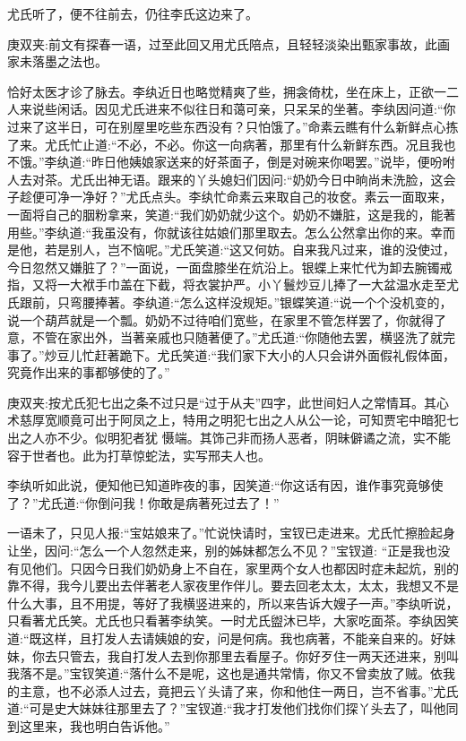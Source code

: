 \begin{parag}
    尤氏听了，便不往前去，仍往李氏这边来了。\begin{note}庚双夹:前文有探春一语，过至此回又用尤氏陪点，且轻轻淡染出甄家事故，此画家未落墨之法也。\end{note}恰好太医才诊了脉去。李纨近日也略觉精爽了些，拥衾倚枕，坐在床上，正欲一二人来说些闲话。因见尤氏进来不似往日和蔼可亲，只呆呆的坐著。李纨因问道:“你过来了这半日，可在别屋里吃些东西没有？只怕饿了。”命素云瞧有什么新鲜点心拣了来。尤氏忙止道:“不必，不必。你这一向病著，那里有什么新鲜东西。况且我也不饿。”李纨道:“昨日他姨娘家送来的好茶面子，倒是对碗来你喝罢。”说毕，便吩咐人去对茶。尤氏出神无语。跟来的丫头媳妇们因问:“奶奶今日中晌尚未洗脸，这会子趁便可净一净好？”尤氏点头。李纨忙命素云来取自己的妆奁。素云一面取来，一面将自己的胭粉拿来，笑道:“我们奶奶就少这个。奶奶不嫌脏，这是我的，能著用些。”李纨道:“我虽没有，你就该往姑娘们那里取去。怎么公然拿出你的来。幸而是他，若是别人，岂不恼呢。”尤氏笑道:“这又何妨。自来我凡过来，谁的没使过，今日忽然又嫌脏了？”一面说，一面盘膝坐在炕沿上。银蝶上来忙代为卸去腕镯戒指，又将一大袱手巾盖在下截，将衣裳护严。小丫鬟炒豆儿捧了一大盆温水走至尤氏跟前，只弯腰捧著。李纨道:“怎么这样没规矩。”银蝶笑道:“说一个个没机变的，说一个葫芦就是一个瓢。奶奶不过待咱们宽些，在家里不管怎样罢了，你就得了意，不管在家出外，当著亲戚也只随著便了。”尤氏道:“你随他去罢，横竖洗了就完事了。”炒豆儿忙赶著跪下。尤氏笑道:“我们家下大小的人只会讲外面假礼假体面，究竟作出来的事都够使的了。”\begin{note}庚双夹:按尤氏犯七出之条不过只是“过于从夫”四字，此世间妇人之常情耳。其心术慈厚宽顺竟可出于阿凤之上，特用之明犯七出之人从公一论，可知贾宅中暗犯七出之人亦不少。似明犯者犹 慑端。其饰己非而扬人恶者，阴昧僻谲之流，实不能容于世者也。此为打草惊蛇法，实写邢夫人也。\end{note}李纨听如此说，便知他已知道昨夜的事，因笑道:“你这话有因，谁作事究竟够使了？”尤氏道:“你倒问我！你敢是病著死过去了！”
\end{parag}


\begin{parag}
    一语未了，只见人报:“宝姑娘来了。”忙说快请时，宝钗已走进来。尤氏忙擦脸起身让坐，因问:“怎么一个人忽然走来，别的姊妹都怎么不见？”宝钗道: “正是我也没有见他们。只因今日我们奶奶身上不自在，家里两个女人也都因时症未起炕，别的靠不得，我今儿要出去伴著老人家夜里作伴儿。要去回老太太，太太，我想又不是什么大事，且不用提，等好了我横竖进来的，所以来告诉大嫂子一声。”李纨听说，只看著尤氏笑。尤氏也只看著李纨笑。一时尤氏盥沐已毕，大家吃面茶。李纨因笑道:“既这样，且打发人去请姨娘的安，问是何病。我也病著，不能亲自来的。好妹妹，你去只管去，我自打发人去到你那里去看屋子。你好歹住一两天还进来，别叫我落不是。”宝钗笑道:“落什么不是呢，这也是通共常情，你又不曾卖放了贼。依我的主意，也不必添人过去，竟把云丫头请了来，你和他住一两日，岂不省事。”尤氏道:“可是史大妹妹往那里去了？”宝钗道:“我才打发他们找你们探丫头去了，叫他同到这里来，我也明白告诉他。”
\end{parag}


